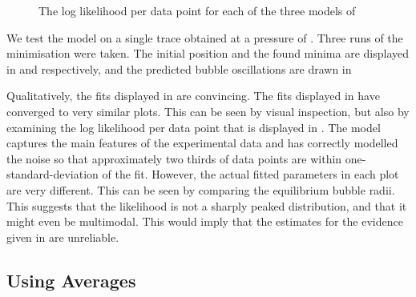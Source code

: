 \begin{figure}[t]%
  \centering
  \subfloat[]{
    \label{fig:plot_bubble_fit_108_150_l:combo}
    }
\caption{The log likelihood per data point for each of the three models of }
\end{figure}



We test the model on a single trace obtained at a pressure of \pOOE.
Three runs of the minimisation were taken.  
The initial position and the found minima are displayed in 
and  respectively,
and the predicted bubble oscillations are drawn in  

Qualitatively, the fits displayed in  are convincing.
The fits displayed in  have converged to very similar plots.
This can be seen by visual inspection,
but also by examining the log likelihood per data point that is displayed in .
The model captures the main features of the experimental data
and has  correctly modelled the  noise so that approximately two thirds of data points are within one-standard-deviation of
the fit.
However, the actual fitted parameters in each plot are very different.
This can be seen  by comparing the equilibrium bubble radii.
This suggests that the likelihood is  not a sharply peaked distribution,
and that it might even be multimodal.
This would imply that the estimates for the evidence given in  are unreliable.




\subsection{Using Averages}

